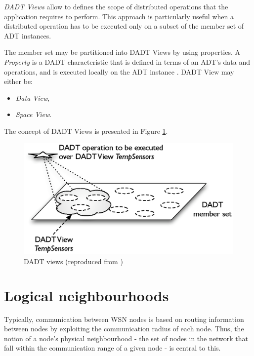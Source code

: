 \emph{DADT Views} allow to defines the scope of distributed operations
that the application requires to perform. This approach is particularly useful
when a distributed operation has to be executed only on a subset of the
member set of ADT instances.

The member set may be partitioned into DADT Views by using properties. A
\emph{Property} is a DADT characteristic that is defined in terms of an ADT's
data and operations, and is executed locally on the ADT instance
\cite{migliavacca_DADT:2006}.
DADT View may either be:
\begin{itemize}
  \item \emph{Data View},
  \item \emph{Space View}.
\end{itemize}

The concept of DADT Views is presented in Figure \ref{Fig:DADT_Views}.

\begin{figure}
\centering
\includegraphics[scale=0.71]{img/DADT_Views.eps} 
\caption[DADT Views]{DADT views (reproduced from \cite{migliavacca_DADT:2006})}
\label{Fig:DADT_Views}
\end{figure}

\section {Logical neighbourhoods} \label{LNDescription}

Typically, communication between WSN nodes is based on routing 
information between nodes by exploiting the communication radius of each node.
Thus, the notion of a node's physical neighbourhood - the set of nodes in the
network that fall within the communication range of a given node - is central to this.

